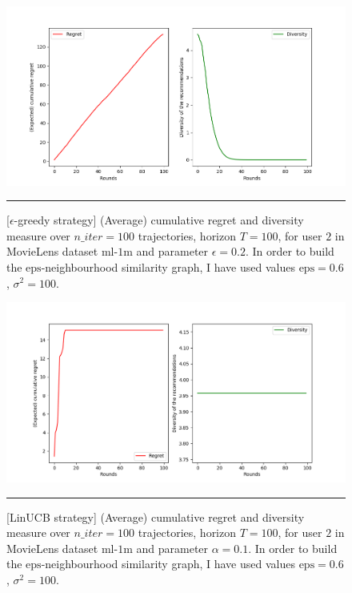 \documentclass{article}
\begin{document}
\begin{figure}[H]
  \centering
  \rule[-.5cm]{0cm}{4cm}
  \includegraphics[scale=0.5]{../Results/greedy_51min6sec.png}
  \rule[-.5cm]{4cm}{0cm}
  \caption{[$\epsilon$-greedy strategy] (Average) cumulative regret and diversity measure over $n\_iter=100$ trajectories, horizon $T=100$, for user $2$ in MovieLens dataset $\text{ml-1m}$ and parameter $\epsilon=0.2$. In order to build the $\text{eps}$-neighbourhood similarity graph, I have used values $\text{eps}=0.6$, $\sigma^{2}=100$.}
\label{figgreedy}
\end{figure}

\begin{figure}[H]
  \centering
  \rule[-.5cm]{0cm}{4cm}
  \includegraphics[scale=0.5]{../Results/linUCB_6min4sec.png}
  \rule[-.5cm]{4cm}{0cm}
  \caption{[LinUCB strategy] (Average) cumulative regret and diversity measure over $n\_iter=100$ trajectories, horizon $T=100$, for user $2$ in MovieLens dataset $\text{ml-1m}$ and parameter $\alpha=0.1$. In order to build the $\text{eps}$-neighbourhood similarity graph, I have used values $\text{eps}=0.6$, $\sigma^{2}=100$.}
\label{figlinUCB}
\end{figure}
\end{document}
